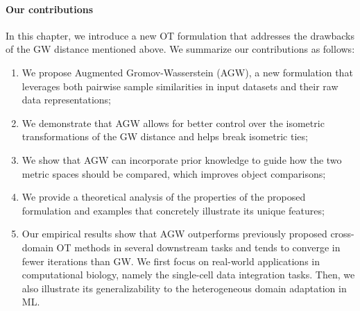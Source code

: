 \paragraph{Our contributions}
In this chapter, we introduce a new OT formulation that addresses the drawbacks of the
GW distance mentioned above. We summarize our contributions as follows:
\begin{enumerate}
    \item We propose Augmented Gromov-Wasserstein (AGW), a new formulation that leverages
    both pairwise sample similarities in input datasets and their raw data representations;
    \item We demonstrate that AGW allows for better control over the isometric transformations
    of the GW distance and helps break isometric ties;
    \item We show that AGW can incorporate prior knowledge to guide how the two metric spaces
    should be compared, which improves object comparisons; %
    \item We provide a theoretical analysis of the properties of the proposed formulation
    and examples that concretely illustrate its unique features;
    \item Our empirical results show that AGW outperforms previously proposed
    cross-domain OT methods in several downstream tasks and tends to converge in fewer iterations
    than GW. We first focus on real-world applications in computational biology,
    namely the single-cell data integration tasks. Then, we also illustrate its generalizability
    to the heterogeneous domain adaptation in ML.
\end{enumerate}


